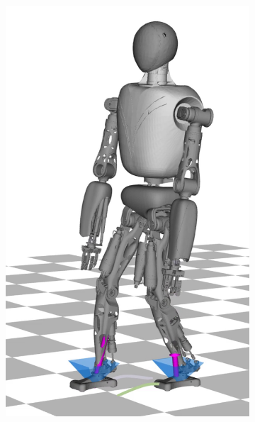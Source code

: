 \begin{figure}
\begin{subfigure}{.16\textwidth}
	\includegraphics[width=.95\linewidth]{fig/walkDynamic/snaps/4}
	\caption{}
\end{subfigure}%
\begin{subfigure}{.16\textwidth}

\end{subfigure}
\end{figure}

